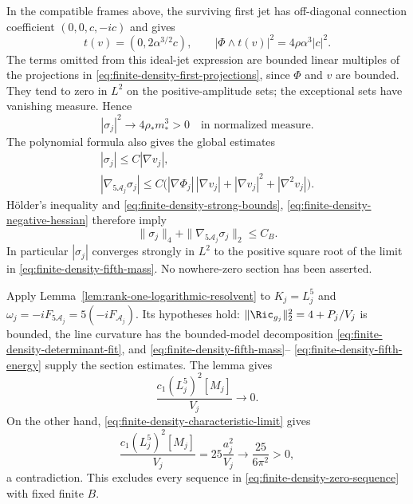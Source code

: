 In the compatible frames above, the surviving first jet has
off-diagonal connection coefficient $(0,0,c,-ic)$ and gives
\[
 t(v)=(0,2\alpha^{3/2}c),\qquad
 |\Phi\wedge t(v)|^2=4\rho\alpha^3|c|^2.
\]
The terms omitted from this ideal-jet expression are bounded linear
multiples of the projections in
\eqref{eq:finite-density-first-projections}, since $\Phi$ and $v$
are bounded.  They tend to zero in $L^2$ on the positive-amplitude
sets; the exceptional sets have vanishing measure.  Hence
\begin{equation}
 |\sigma_j|^2\longrightarrow
       4\rho_*m_*^3>0\quad\text{in normalized measure}.
 \label{eq:finite-density-fifth-mass}
\end{equation}
The polynomial formula also gives the global estimates
\begin{gather*}
 |\sigma_j|\le C|\nabla v_j|,\\
 |\nabla_{5\mathcal A_j}\sigma_j|
       \le C\bigl(|\nabla\Phi_j|\,|\nabla v_j|
                    +|\nabla v_j|^2+|\nabla^2v_j|\bigr).
\end{gather*}
H\"older's inequality and
\eqref{eq:finite-density-strong-bounds},
\eqref{eq:finite-density-negative-hessian} therefore imply
\begin{equation}
 \|\sigma_j\|_4+\|\nabla_{5\mathcal A_j}\sigma_j\|_2\le C_B.
 \label{eq:finite-density-fifth-energy}
\end{equation}
In particular $|\sigma_j|$ converges strongly in $L^2$ to the
positive square root of the limit in
\eqref{eq:finite-density-fifth-mass}.  No nowhere-zero section has
been asserted.

Apply Lemma~\ref{lem:rank-one-logarithmic-resolvent} to $K_j=L_j^5$
and $\omega_j=-iF_{5\mathcal A_j}=5(-iF_{\mathcal A_j})$.
Its hypotheses hold: $\|\Ric_{g_j}\|_2^2=4+P_j/V_j$ is bounded,
the line curvature has the bounded-model decomposition
\eqref{eq:finite-density-determinant-fit}, and
\eqref{eq:finite-density-fifth-mass}--
\eqref{eq:finite-density-fifth-energy} supply the section estimates.
The lemma gives
\[
 \frac{c_1(L_j^5)^2[M_j]}{V_j}\longrightarrow0.
\]
On the other hand,
\eqref{eq:finite-density-characteristic-limit} gives
\begin{equation}
 \frac{c_1(L_j^5)^2[M_j]}{V_j}
       =25\frac{a_j^2}{V_j}
       \longrightarrow\frac{25}{6\pi^2}>0,
 \label{eq:finite-density-contradiction}
\end{equation}
a contradiction.  This excludes every sequence in
\eqref{eq:finite-density-zero-sequence} with fixed finite $B$.

